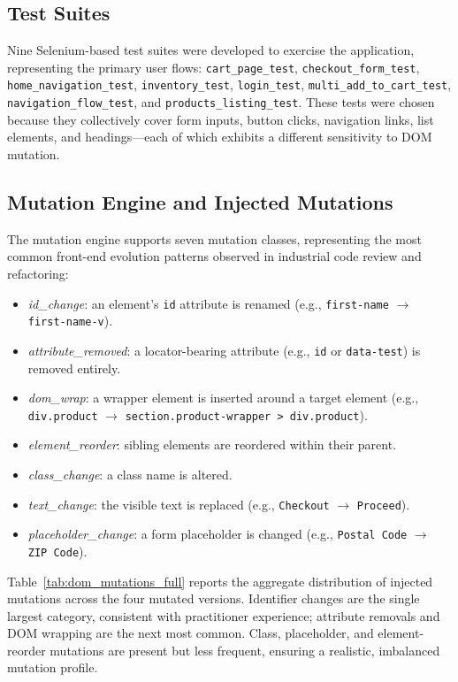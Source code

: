 \documentclass[conference]{IEEEtran}
\begin{document}
\subsection{Test Suites}
Nine Selenium-based test suites were developed to exercise the application, representing the primary user flows: \texttt{cart\_page\_test}, \texttt{checkout\_form\_test}, \texttt{home\_navigation\_test}, \texttt{inventory\_test}, \texttt{login\_test}, \texttt{multi\_add\_to\_cart\_test}, \texttt{navigation\_flow\_test}, and \texttt{products\_listing\_test}. These tests were chosen because they collectively cover form inputs, button clicks, navigation links, list elements, and headings---each of which exhibits a different sensitivity to DOM mutation.

\subsection{Mutation Engine and Injected Mutations}
The mutation engine supports seven mutation classes, representing the most common front-end evolution patterns observed in industrial code review and refactoring:
\begin{itemize}[leftmargin=1.2em]
    \item \emph{id\_change}: an element's \texttt{id} attribute is renamed (e.g., \texttt{first-name} $\rightarrow$ \texttt{first-name-v}).
    \item \emph{attribute\_removed}: a locator-bearing attribute (e.g., \texttt{id} or \texttt{data-test}) is removed entirely.
    \item \emph{dom\_wrap}: a wrapper element is inserted around a target element (e.g., \texttt{div.product} $\rightarrow$ \texttt{section.product-wrapper > div.product}).
    \item \emph{element\_reorder}: sibling elements are reordered within their parent.
    \item \emph{class\_change}: a class name is altered.
    \item \emph{text\_change}: the visible text is replaced (e.g., \texttt{Checkout} $\rightarrow$ \texttt{Proceed}).
    \item \emph{placeholder\_change}: a form placeholder is changed (e.g., \texttt{Postal Code} $\rightarrow$ \texttt{ZIP Code}).
\end{itemize}
Table~\ref{tab:dom_mutations_full} reports the aggregate distribution of injected mutations across the four mutated versions. Identifier changes are the single largest category, consistent with practitioner experience; attribute removals and DOM wrapping are the next most common. Class, placeholder, and element-reorder mutations are present but less frequent, ensuring a realistic, imbalanced mutation profile.
\end{document}
